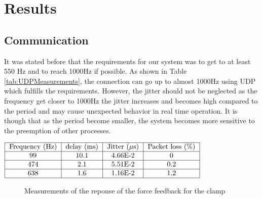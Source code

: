 \section{Results}

\subsection{Communication}

 It was stated before that the requirements for our system was to get to at least 550 Hz and to reach 1000Hz if possible. As shown in Table \ref{tab:UDPMeasurements}, the connection can go up to almost 1000Hz using UDP which fulfills the requirements. However, the jitter should not be neglected as the frequency get closer to 1000Hz the jitter increases and becomes high compared to the period and may cause unexpected behavior in real time operation. It is though that as the period become smaller, the system becomes more sensitive to the preemption of other processes.
\begin{center}
  $\begin{tabular}{|c|c|c|c|c|c|}
    \hline
    \text{Frequency (Hz)} & \text{delay (ms)} & \text{Jitter ($\mu$s)} & \text{Packet loss (\%)}\\
    \hline
    99 & 10.1 & 4.66E-2 & 0 \\
    \hline
    474 & 2.1 & 5.51E-2 & 0.2 \\
    \hline
    638 & 1.6 & 1.16E-2 & 1.2 \\
    \hline
  \end{tabular}$
  \label{tab:UDPMeasurements}

\end{center}


\begin{figure}[h]
  
  \caption{Measurements of the reponse of the force feedback for the clamp}
\end{figure}

%     
%     





